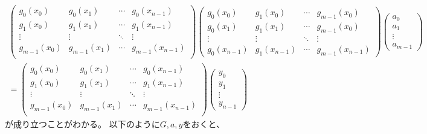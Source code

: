 \documentclass{jsarticle}
\begin{document}
\begin{eqnarray}
    \left(
      \begin{array}{cccc}
        g_0(x_0) & g_0(x_1) & \cdots & g_0(x_{n-1}) \\
        g_1(x_0) & g_1(x_1) & \cdots & g_1(x_{n-1}) \\
        \vdots & \vdots & \ddots & \vdots \\
        g_{m-1}(x_0) & g_{m-1}(x_1) & \cdots & g_{m-1}(x_{n-1}) \\
      \end{array}
    \right)
    \left(
      \begin{array}{cccc}
        g_0(x_0) & g_1(x_0) & \cdots & g_{m-1}(x_0) \\
        g_0(x_1) & g_1(x_1) & \cdots & g_{m-1}(x_0) \\
        \vdots & \vdots & \ddots & \vdots \\
        g_0(x_{n-1}) & g_1(x_{n-1}) & \cdots & g_{m-1}(x_{n-1})  
      \end{array}
    \right)
    \left(
      \begin{array}{c}
        a_0 \\ a_1 \\ \vdots \\ a_{m-1}
      \end{array}
    \right)\nonumber \\
    =\left(
        \begin{array}{cccc}
          g_0(x_0) & g_0(x_1) & \cdots & g_0(x_{n-1}) \\
          g_1(x_0) & g_1(x_1) & \cdots & g_1(x_{n-1}) \\
          \vdots & \vdots & \ddots & \vdots \\
          g_{m-1}(x_0) &  g_{m-1}(x_1) & \cdots &  g_{m-1}(x_{n-1}) \\
        \end{array}
      \right)
    \left(
      \begin{array}{c}
        y_0 \\ y_1 \\ \vdots \\ y_{n-1}
      \end{array}
    \right)
\end{eqnarray}
が成り立つことがわかる。
以下のように\(G,a,y\)をおくと、
\end{document}
